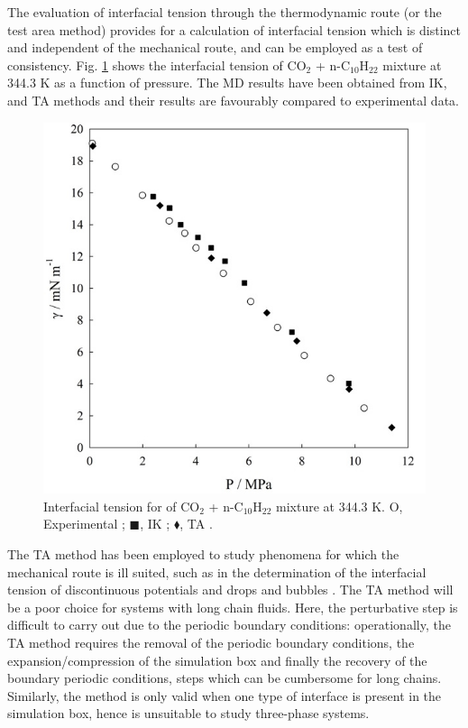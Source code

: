 \documentclass[9pt,bestpractices]{livecoms}
\begin{document}
The evaluation of interfacial tension through the thermodynamic route (or the
test area method) provides for a calculation of interfacial tension which is
distinct and independent of the mechanical route, and can be employed as a test
of consistency. Fig. \ref{fig:21} shows the interfacial tension of CO$_{2}$
+ n-C$_{10}$H$_{22}$ mixture at 344.3 K as a function of pressure. The MD
results have been obtained from IK, and TA methods and their results are
favourably compared to experimental data.
\begin{figure}
\includegraphics[width=0.8\linewidth]{gfx/image67.jpeg}
\caption{Interfacial tension for of CO$_{2}$ + n-C$_{10}$H$_{22}$ mixture at 344.3 K. O, Experimental \citep{mejia2014a}; ${\blacksquare}$, IK \citep{mejia2014a}; $\blacklozenge$, TA \citep{muller2009} .}
\label{fig:21}
\end{figure}
The TA method has been employed to study phenomena for which the mechanical route
is ill suited, such as in the determination of the interfacial tension of
discontinuous potentials \citep{gloor2005}
and drops and bubbles \citep{lau2015,sampayo2010}. The TA method will be a poor choice
for systems with long chain fluids. Here, the perturbative step is difficult to
carry out due to the periodic boundary conditions: operationally, the TA method
requires the removal of the periodic boundary conditions, the
expansion/compression of the simulation box and finally the recovery of the
boundary periodic conditions, steps which can be cumbersome for long chains.
Similarly, the method is only valid when one type of interface is present in the
simulation box, hence is unsuitable to study three-phase systems. 
\end{document}
